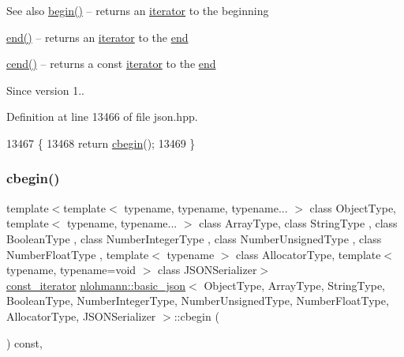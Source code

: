 \begin{DoxySeeAlso}{See also}
\hyperlink{classnlohmann_1_1basic__json_a0ff28dac23f2bdecee9564d07f51dcdc}{begin()} -- returns an \hyperlink{classnlohmann_1_1basic__json_a099316232c76c034030a38faa6e34dca}{iterator} to the beginning 

\hyperlink{classnlohmann_1_1basic__json_a13e032a02a7fd8a93fdddc2fcbc4763c}{end()} -- returns an \hyperlink{classnlohmann_1_1basic__json_a099316232c76c034030a38faa6e34dca}{iterator} to the \hyperlink{classnlohmann_1_1basic__json_a13e032a02a7fd8a93fdddc2fcbc4763c}{end} 

\hyperlink{classnlohmann_1_1basic__json_a8dba7b7d2f38e6b0c614030aa43983f6}{cend()} -- returns a const \hyperlink{classnlohmann_1_1basic__json_a099316232c76c034030a38faa6e34dca}{iterator} to the \hyperlink{classnlohmann_1_1basic__json_a13e032a02a7fd8a93fdddc2fcbc4763c}{end}
\end{DoxySeeAlso}
\begin{DoxySince}{Since}
version 1.. 
\end{DoxySince}


Definition at line 13466 of file json.\+hpp.


\begin{DoxyCode}
13467     \{
13468         \textcolor{keywordflow}{return} \hyperlink{classnlohmann_1_1basic__json_ad865d6c291b237ae508d5cb2146b5877}{cbegin}();
13469     \}
\end{DoxyCode}
\mbox{\label{classnlohmann_1_1basic__json_ad865d6c291b237ae508d5cb2146b5877}} 
\subsubsection{\texorpdfstring{cbegin()}{cbegin()}}
{\footnotesize\ttfamily template$<$template$<$ typename, typename, typename... $>$ class Object\+Type, template$<$ typename, typename... $>$ class Array\+Type, class String\+Type , class Boolean\+Type , class Number\+Integer\+Type , class Number\+Unsigned\+Type , class Number\+Float\+Type , template$<$ typename $>$ class Allocator\+Type, template$<$ typename, typename=void $>$ class J\+S\+O\+N\+Serializer$>$ \\
\hyperlink{classnlohmann_1_1basic__json_a41a70cf9993951836d129bb1c2b3126a}{const\+\_\+iterator} \hyperlink{classnlohmann_1_1basic__json}{nlohmann\+::basic\+\_\+json}$<$ Object\+Type, Array\+Type, String\+Type, Boolean\+Type, Number\+Integer\+Type, Number\+Unsigned\+Type, Number\+Float\+Type, Allocator\+Type, J\+S\+O\+N\+Serializer $>$\+::cbegin (\begin{DoxyParamCaption}{ }\end{DoxyParamCaption}) const\hspace{0.3cm}{\ttfamily [inline]}, {\ttfamily [noexcept]}}



